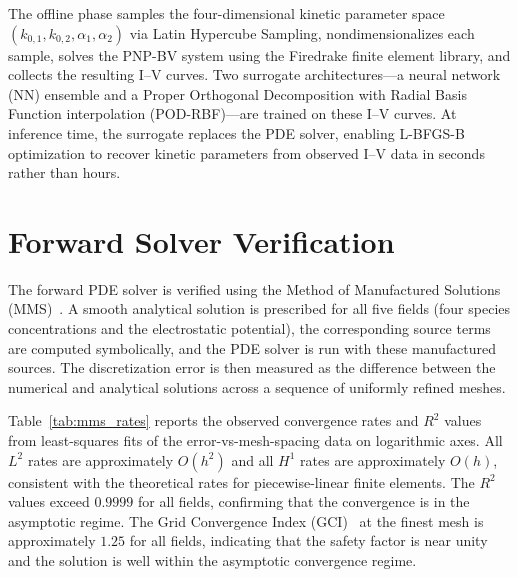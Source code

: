 \documentclass[11pt,a4paper]{article}
\begin{document}
The offline phase samples the four-dimensional kinetic parameter space
$(k_{0,1}, k_{0,2}, \alpha_1, \alpha_2)$ via Latin Hypercube Sampling,
nondimensionalizes each sample, solves the PNP-BV system using the
Firedrake finite element library, and collects the resulting I--V curves.
Two surrogate architectures---a neural network (NN) ensemble and a
Proper Orthogonal Decomposition with Radial Basis Function interpolation
(POD-RBF)---are trained on these I--V curves. At inference time, the
surrogate replaces the PDE solver, enabling L-BFGS-B optimization to
recover kinetic parameters from observed I--V data in seconds rather than
hours.

\section{Forward Solver Verification}
\label{sec:forward}

The forward PDE solver is verified using the Method of Manufactured
Solutions (MMS)~\cite{roache2002,salari2000}. A smooth analytical solution
is prescribed for all five fields (four species concentrations and the
electrostatic potential), the corresponding source terms are computed
symbolically, and the PDE solver is run with these manufactured sources.
The discretization error is then measured as the difference between the
numerical and analytical solutions across a sequence of uniformly refined
meshes.

Table~\ref{tab:mms_rates} reports the observed convergence rates and
$R^2$ values from least-squares fits of the error-vs-mesh-spacing data on
logarithmic axes. All $L^2$ rates are approximately $O(h^2)$ and all $H^1$
rates are approximately $O(h)$, consistent with the theoretical rates for
piecewise-linear finite elements. The $R^2$ values exceed $0.9999$ for all
fields, confirming that the convergence is in the asymptotic regime. The
Grid Convergence Index (GCI)~\cite{roache1998} at the finest mesh is
approximately $1.25$ for all fields, indicating that the safety factor is
near unity and the solution is well within the asymptotic convergence
regime.

\begin{table}[htbp]
\centering
\caption{MMS convergence rates, goodness of fit, and GCI at the finest
mesh for all five fields. Rates are computed from least-squares regression
on four mesh levels ($h \in \{1/8, 1/16, 1/32, 1/64\}$).}
\label{tab:mms_rates}

\end{table}
\end{document}
